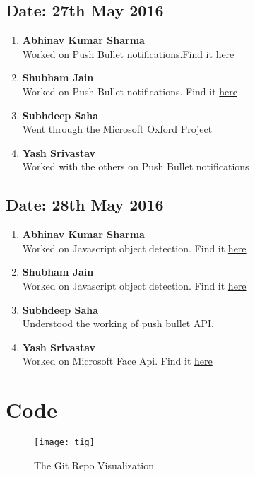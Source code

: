\documentclass[11pt,a4paper]{article}
\begin{document}
    \subsection{Date: 27th May 2016}
      \begin{enumerate}
        \item
          \textbf{Abhinav Kumar Sharma\\ }
            Worked on Push Bullet notifications.Find it \href{https://github.com/11000011/Smart-Mirror/pull/5}{here}
        \item
          \textbf{Shubham Jain}\\ 
            Worked on Push Bullet notifications. Find it \href{https://github.com/11000011/Smart-Mirror/pull/5}{here}
        \item
          \textbf{Subhdeep Saha}\\ 
            Went through the Microsoft Oxford Project
        \item
          \textbf{Yash Srivastav}\\ 
            Worked with the others on Push Bullet notifications
      \end{enumerate}
    \subsection{Date: 28th May 2016}
      \begin{enumerate}
        \item
          \textbf{Abhinav Kumar Sharma\\ }
            Worked on Javascript object detection. Find it \href{https://github.com/jmoriarity221B/js_object_detector.git}{here}
        \item
          \textbf{Shubham Jain}\\ 
            Worked on Javascript object detection. Find it \href{https://github.com/jmoriarity221B/js_object_detector.git}{here}
        \item
          \textbf{Subhdeep Saha}\\ 
            Understood the working of push bullet API.
        \item
          \textbf{Yash Srivastav}\\ 
            Worked on Microsoft Face Api. Find it \href{https://github.com/11000011/Smart-Mirror/wiki/Working-with-the-Microsoft-Oxford-Project-API}{here}
      \end{enumerate}
  \newpage
  \section{Code}
    \begin{figure}[ht]
      \centering
      \texttt{[image: tig]}
      \caption{The Git Repo Visualization}
    \end{figure}
\end{document}
